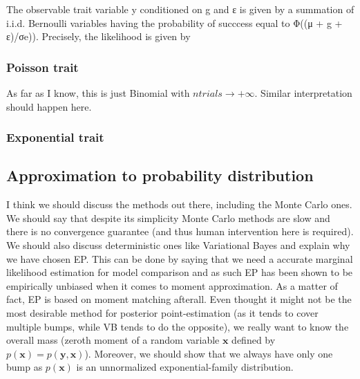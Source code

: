 The observable trait variable y conditioned on g and ε is given by a summation
of i.i.d. Bernoulli variables having the probability of succcess equal to Φ((μ +
g + ε)/σe)). Precisely, the likelihood is given by

\subsubsection{Poisson trait}

As far as I know, this is just Binomial with $ntrials \rightarrow +\infty$.
Similar interpretation should happen here.

\subsubsection{Exponential trait}



\subsection{Approximation to probability distribution}

I think we should discuss the methods out there, including the Monte Carlo ones.
We should say that despite its simplicity Monte Carlo methods are slow and there
is no convergence guarantee (and thus human intervention here is required). We
should also discuss deterministic ones like Variational Bayes and explain why we
have chosen EP. This can be done by saying that we need a accurate marginal
likelihood estimation for model comparison and as such EP has been shown to be
empirically unbiased when it comes to moment approximation. As a matter of fact,
EP is based on moment matching afterall. Even thought it might not be the most
desirable method for posterior point-estimation (as it tends to cover multiple
bumps, while VB tends to do the opposite), we really want to know the overall
mass (zeroth moment of a random variable $\mathbf x$ defined by $p(\mathbf x) =
p(\mathbf y, \mathbf x)$). Moreover, we should show that we always have only one
bump as $p(\mathbf x)$ is an unnormalized exponential-family distribution.

